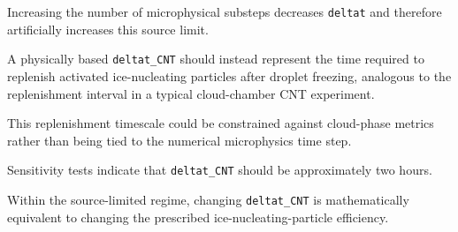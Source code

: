 Increasing the number of microphysical substeps decreases \texttt{deltat} and therefore artificially increases this source limit.

A physically based \texttt{deltat\_CNT} should instead represent the time required to replenish activated ice-nucleating particles after droplet freezing, analogous to the replenishment interval in a typical cloud-chamber CNT experiment.

This replenishment timescale could be constrained against cloud-phase metrics rather than being tied to the numerical microphysics time step.

Sensitivity tests indicate that \texttt{deltat\_CNT} should be approximately two hours.

Within the source-limited regime, changing \texttt{deltat\_CNT} is mathematically equivalent to changing the prescribed ice-nucleating-particle efficiency.
%

